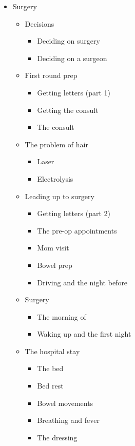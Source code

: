 \begin{itemize}
\tightlist
\item
  Surgery

  \begin{itemize}
  \tightlist
  \item
    Decisions

    \begin{itemize}
    \tightlist
    \item
      Deciding on surgery
    \item
      Deciding on a surgeon
    \end{itemize}
  \item
    First round prep

    \begin{itemize}
    \tightlist
    \item
      Getting letters (part 1)
    \item
      Getting the consult
    \item
      The consult
    \end{itemize}
  \item
    The problem of hair

    \begin{itemize}
    \tightlist
    \item
      Laser
    \item
      Electrolysis
    \end{itemize}
  \item
    Leading up to surgery

    \begin{itemize}
    \tightlist
    \item
      Getting letters (part 2)
    \item
      The pre-op appointments
    \item
      Mom visit
    \item
      Bowel prep
    \item
      Driving and the night before
    \end{itemize}
  \item
    Surgery

    \begin{itemize}
    \tightlist
    \item
      The morning of
    \item
      Waking up and the first night
    \end{itemize}
  \item
    The hospital stay

    \begin{itemize}
    \tightlist
    \item
      The bed
    \item
      Bed rest
    \item
      Bowel movements
    \item
      Breathing and fever
    \item
      The dressing


\end{itemize}
\end{itemize}
\end{itemize}
